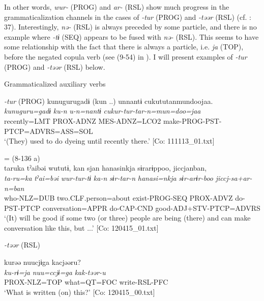 In other words, \textit{wur-} (PROG) and \textit{ar-} (RSL) show much progress in the grammaticalization channels in the cases of \textit{{}-tur} (PROG) and \textit{{}-təər} (RSL) (cf. \citealt{Lehmann1995}: 37). Interestingly, \textit{nə-} (RSL) is always preceded by some particle, and there is no example where \textit{-tɨ} (SEQ) appears to be fused with \textit{nə-} (RSL). This seems to have some relationship with the fact that there is always a particle, i.e. \textit{ja} (TOP), before the negated copula verb (see (9-54) in ). I will present examples of \textit{{}-tur} (PROG) and \textit{{}-təər} (RSL) below.

\ea   Grammaticalized auxiliary verbs \label{ex:9.9}

\exi{} \textit{{}-tur} (PROG)
\ea %
 \glll  kunugurugadɨ  (kun ..)  unnantɨ    cukututanmundoojaa.\\
      \textit{kunuguru=gadɨ}  \textit{ku-n}  \textit{u-n=nantɨ}       \textit{cukur-tur{}-tar-n=mun=doo=jaa}\\
      recently=LMT  PROX-ADNZ  MES-ADNZ=LCO2    make-PROG-PST-PTCP=ADVRS=ASS=SOL\\
      \glt       ‘(They) used to do dyeing until recently there.’ [Co: 111113\_01.txt]

  \ex{} = (8-136 a)\\
     \glll      taruka  tˀaibəi  wututɨ,  kan   sjan  hanasinkja  sɨrarɨppoo,  jiccjanban,\\
      \textit{ta-ru=ka}  \textit{tˀai=bəi}  \textit{wur-tur{}-tɨ}  \textit{ka-n} \textit{sɨr-tar-n}  \textit{hanasi=nkja}  \textit{sɨr-arɨr-boo}  \textit{jiccj-sa+ar-n=ban}\\
      who-NLZ=DUB  two.CLF.person=about  exist-PROG-SEQ  PROX-ADVZ   do-PST-PTCP  conversation=APPR  do-CAP-CND  good-ADJ+STV-PTCP=ADVRS   \\
      \glt       ‘(It) will be good if some two (or three) people are being (there) and can make conversation like this, but ...’ [Co: 120415\_01.txt]

\exi{} \textit{{}-təər} (RSL)

\ex \label{ex:9.9c} %
     \glll     kurəə  nuucjɨga  kacjəəru?\\
      \textit{ku-rɨ=ja}  \textit{nuu=ccjɨ=ga}  \textit{kak-təər{}-u}\\
      PROX-NLZ=TOP  what=QT=FOC  write-RSL-PFC\\
      \glt       ‘What is written (on) this?’ [Co: 120415\_00.txt]

